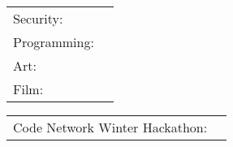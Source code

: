 \documentclass[]{awesome-cv}
\begin{document}
\begin{cventries}
	\cventry
	{}
	{\def\arraystretch{1.15}{\begin{tabular}{ l l }
		Security:  & {\skill{ Hardware, Social Engineering, Physical Security}} \\
		Programming:  & {\skill{ Firmware, Automation, Game Development/ Gamification}} \\
		Art:  & {\skill{ Painting, Drawing, Portraiture}} \\
		Film: & {\skill{ Horror, Sci-fi}} \\
		\end{tabular}}}
	{}
	{}
	{}
	\vspace{-7mm}
\end{cventries}

\begin{cventries}
	\cventry
	{}
	{\def\arraystretch{1.15}{\begin{tabular}{ l l }
		Code Network Winter Hackathon:  & {\skill{ Individual prize}} \\
		\end{tabular}}}
	{}
	{}
	{}
\end{cventries}

\ 
\end{document}
